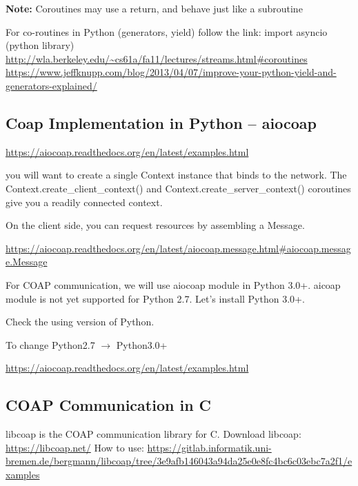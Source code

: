 \documentclass[letterpaper,10pt,english]{sphinxmanual}
\begin{document}
\textbf{Note:} Coroutines may use a return, and behave just like a subroutine

For co-routines in Python (generators, yield) follow the link: import asyncio (python library)
\href{http://wla.berkeley.edu/~cs61a/fa11/lectures/streams.html\#coroutines}{http://wla.berkeley.edu/\textasciitilde{}cs61a/fa11/lectures/streams.html\#coroutines}
\href{https://www.jeffknupp.com/blog/2013/04/07/improve-your-python-yield-and-generators-explained/}{https://www.jeffknupp.com/blog/2013/04/07/improve-your-python-yield-and-generators-explained/}


\subsection{Coap Implementation in Python – aiocoap}
\label{week-10:coap-implementation-in-python-aiocoap}
\href{https://aiocoap.readthedocs.org/en/latest/examples.html}{https://aiocoap.readthedocs.org/en/latest/examples.html}

you will want to create a single Context instance that binds to the network.  The Context.create\_client\_context() and Context.create\_server\_context() coroutines give you a readily connected context.

On the client side, you can request resources by assembling a Message.

\href{https://aiocoap.readthedocs.org/en/latest/aiocoap.message.html\#aiocoap.message.Message}{https://aiocoap.readthedocs.org/en/latest/aiocoap.message.html\#aiocoap.message.Message}

For COAP communication, we will use aiocoap module in Python 3.0+. aicoap module is not yet supported for Python 2.7. Let's install Python 3.0+.

Check the using version of Python.


To change Python2.7 \(\rightarrow\) Python3.0+


\href{https://aiocoap.readthedocs.org/en/latest/examples.html}{https://aiocoap.readthedocs.org/en/latest/examples.html}


\subsection{COAP Communication in C}
\label{week-10:coap-communication-in-c}
libcoap is the COAP communication library for C.
Download libcoap: \href{https://libcoap.net/}{https://libcoap.net/}
How to use: \href{https://gitlab.informatik.uni-bremen.de/bergmann/libcoap/tree/3e9afb146043a94da25e0e8fc4bc6c03ebc7a2f1/examples}{https://gitlab.informatik.uni-bremen.de/bergmann/libcoap/tree/3e9afb146043a94da25e0e8fc4bc6c03ebc7a2f1/examples}
\end{document}
